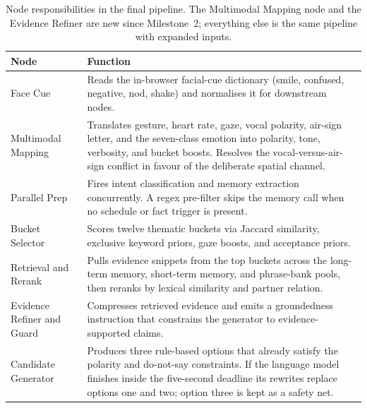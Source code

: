 \documentclass[10pt,letterpaper]{article}
\begin{document}
\begin{table}[t]
  \footnotesize
  \begin{tabularx}{\linewidth}{@{}lX@{}}
    \toprule
    \rowcolor{tblHeadArch}\textbf{Node} & \textbf{Function}\\
    \midrule
    Face Cue                 & Reads the in-browser facial-cue dictionary
                                (smile, confused, negative, nod, shake) and
                                normalises it for downstream nodes.\\
    Multimodal Mapping       & Translates gesture, heart rate, gaze, vocal
                                polarity, air-sign letter, and the seven-class
                                emotion into polarity, tone, verbosity, and
                                bucket boosts. Resolves the
                                vocal-versus-air-sign conflict in favour of
                                the deliberate spatial channel.\\
    Parallel Prep            & Fires intent classification and memory
                                extraction concurrently. A regex pre-filter
                                skips the memory call when no schedule or
                                fact trigger is present.\\
    Bucket Selector          & Scores twelve thematic buckets via Jaccard
                                similarity, exclusive keyword priors, gaze
                                boosts, and acceptance priors.\\
    Retrieval and Rerank     & Pulls evidence snippets from the top buckets
                                across the long-term memory, short-term
                                memory, and phrase-bank pools, then reranks
                                by lexical similarity and partner relation.\\
    Evidence Refiner and Guard
                             & Compresses retrieved evidence and emits a
                                groundedness instruction that constrains the
                                generator to evidence-supported claims.\\
    Candidate Generator      & Produces three rule-based options that
                                already satisfy the polarity and do-not-say
                                constraints. If the language model finishes
                                inside the five-second deadline its rewrites
                                replace options one and two; option three is
                                kept as a safety net.\\
    \bottomrule
  \end{tabularx}
  \caption{Node responsibilities in the final pipeline. The Multimodal
           Mapping node and the Evidence Refiner are new since
           Milestone~2; everything else is the same pipeline with
           expanded inputs.}
  \label{tab:arch}
\end{table}
\end{document}
